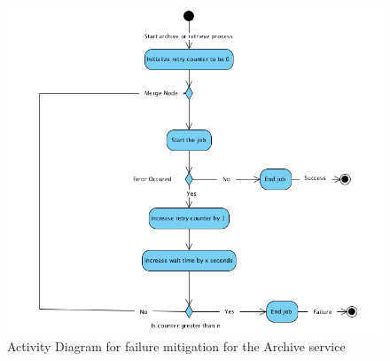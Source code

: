 \begin{figure}[H]
    \centering \includegraphics[scale=0.6]{grafiken/activityFailure.png}
    \caption{Activity Diagram for failure mitigation for the Archive service}
    \label{fig:activityFailure}
\end{figure}

